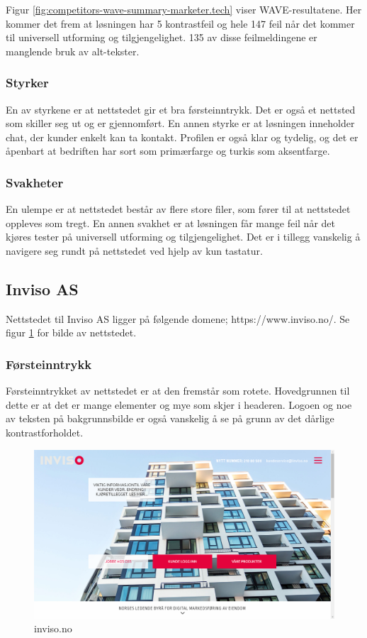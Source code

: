 Figur \ref{fig:competitors-wave-summary-marketer.tech} viser WAVE-resultatene. Her kommer det frem at løsningen har 5 kontrastfeil og hele 147 feil når det kommer til universell utforming og tilgjengelighet. 135 av disse feilmeldingene er manglende bruk av alt-tekster.

\subsubsection{Styrker}
En av styrkene er at nettstedet gir et bra førsteinntrykk. Det er også et nettsted som skiller seg ut og er gjennomført. En annen styrke er at løsningen inneholder chat, der kunder enkelt kan ta kontakt. Profilen er også klar og tydelig, og det er åpenbart at bedriften har sort som primærfarge og turkis som aksentfarge.

\subsubsection{Svakheter}
En ulempe er at nettstedet består av flere store filer, som fører til at nettstedet oppleves som tregt. En annen svakhet er at løsningen får mange feil når det kjøres tester på universell utforming og tilgjengelighet. Det er i tillegg vanskelig å navigere seg rundt på nettstedet ved hjelp av kun tastatur.

\subsection{Inviso AS}
Nettstedet til Inviso AS ligger på følgende domene;
https://www.inviso.no/. Se figur \ref{fig:competitors-inviso.no} for bilde av nettstedet.

\subsubsection{Førsteinntrykk}
Førsteinntrykket av nettstedet er at den fremstår som rotete. Hovedgrunnen til dette er at det er mange elementer og mye som skjer i headeren. Logoen og noe av teksten på bakgrunnsbilde er også vanskelig å se på grunn av det dårlige kontrastforholdet. 

\begin{figure}[H]
    \centering
    \includegraphics[width=\textwidth]{line/inviso_no_(1366x768).png}
    \caption{inviso.no}
    \label{fig:competitors-inviso.no}
\end{figure}

